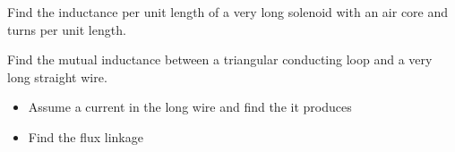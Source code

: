 \begin{ELexample}{}

Find the inductance per unit length of a very long solenoid with an air core and  turns per unit length.

\begin{ELsolution}


\end{ELsolution}

\end{ELexample}


\begin{ELexample}{}

Find the mutual inductance between a triangular conducting loop and a very long straight wire.


\begin{ELsolution}

\begin{itemize}
\tightlist
\item
  Assume a current  in the long wire and find the  it produces
\end{itemize}


\begin{itemize}
\tightlist
\item
  Find the flux linkage
\end{itemize}


\begin{ELimportant}{}


\end{ELimportant}

\end{ELsolution}

\end{ELexample}

